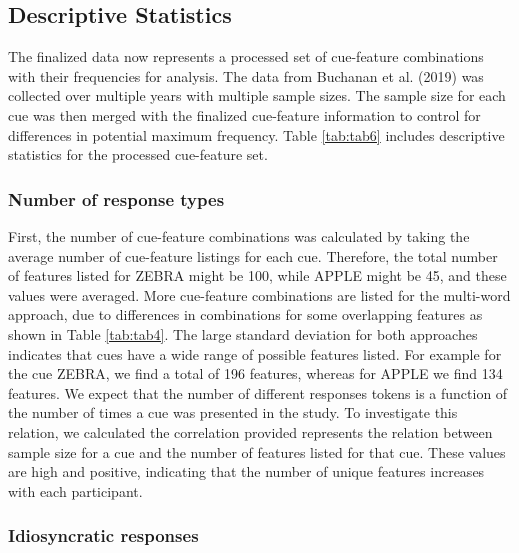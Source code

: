 \documentclass[man]{apa6}
\begin{document}
\hypertarget{descriptive-statistics}{%
\subsection{Descriptive Statistics}\label{descriptive-statistics}}

The finalized data now represents a processed set of cue-feature combinations with their frequencies for analysis. The data from Buchanan et al. (2019) was collected over multiple years with multiple sample sizes. The sample size for each cue was then merged with the finalized cue-feature information to control for differences in potential maximum frequency. Table \ref{tab:tab6} includes descriptive statistics for the processed cue-feature set.

\hypertarget{number-of-response-types}{%
\subsubsection{Number of response types}\label{number-of-response-types}}

First, the number of cue-feature combinations was calculated by taking the average number of cue-feature listings for each cue. Therefore, the total number of features listed for ZEBRA might be 100, while APPLE might be 45, and these values were averaged. More cue-feature combinations are listed for the multi-word approach, due to differences in combinations for some overlapping features as shown in Table \ref{tab:tab4}. The large standard deviation for both approaches indicates that cues have a wide range of possible features listed. For example for the cue ZEBRA, we find a total of 196 features, whereas for APPLE we find 134 features. We expect that the number of different responses tokens is a function of the number of times a cue was presented in the study. To investigate this relation, we calculated the correlation provided represents the relation between sample size for a cue and the number of features listed for that cue. These values are high and positive, indicating that the number of unique features increases with each participant.

\hypertarget{idiosyncratic-responses}{%
\subsubsection{Idiosyncratic responses}\label{idiosyncratic-responses}}
\end{document}
